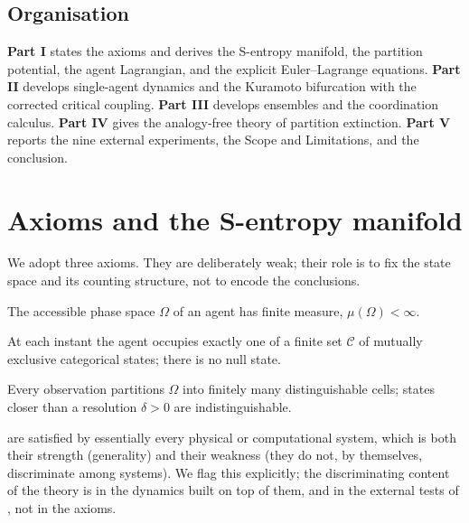 \documentclass[11pt,twocolumn,a4paper]{article}
\begin{document}
\subsection{Organisation}

\textbf{Part I} states the axioms and derives the S-entropy manifold, the
partition potential, the agent Lagrangian, and the explicit Euler--Lagrange
equations. \textbf{Part II} develops single-agent dynamics and the Kuramoto
bifurcation with the corrected critical coupling. \textbf{Part III} develops
ensembles and the coordination calculus. \textbf{Part IV} gives the
analogy-free theory of partition extinction. \textbf{Part V} reports the nine
external experiments, the Scope and Limitations, and the conclusion.

\section{Axioms and the S-entropy manifold}
\label{sec:axioms}

We adopt three axioms. They are deliberately weak; their role is to fix the
state space and its counting structure, not to encode the conclusions.

\begin{axiom}\label{ax:bounded}
The accessible phase space $\Omega$ of an agent has finite measure,
$\mu(\Omega)<\infty$.
\end{axiom}

\begin{axiom}\label{ax:null}
At each instant the agent occupies exactly one of a finite set $\mathcal{C}$ of
mutually exclusive categorical states; there is no null state.
\end{axiom}

\begin{axiom}\label{ax:resolution}
Every observation partitions $\Omega$ into finitely many distinguishable cells;
states closer than a resolution $\delta>0$ are indistinguishable.
\end{axiom}

\begin{remark}
 are satisfied by essentially every
physical or computational system, which is both their strength (generality) and
their weakness (they do not, by themselves, discriminate among systems). We
flag this explicitly; the discriminating content of the theory is in the
dynamics built on top of them, and in the external tests of
, not in the axioms.
\end{remark}
\end{document}
